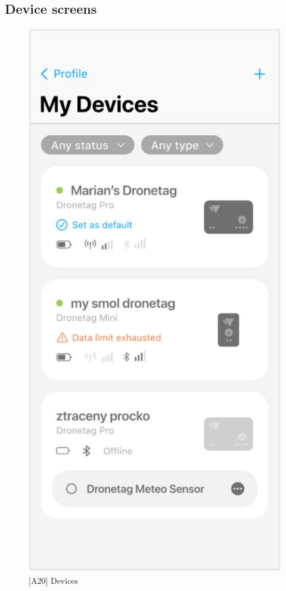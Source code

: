 \subsection{Device screens}\label{subsec:device-screens}


\begin{figure}
    \centering
    \begin{minipage}{.45\textwidth}
        \centering
        \includegraphics[width=.7\linewidth]{assets/user_interface_design/device/devices.png}
        \caption{[A20] Devices}
        \label{fig:devices}
    \end{minipage}%
    \hspace{.05\linewidth}
    \begin{minipage}{.45\textwidth}
        \centering

\end{minipage}
\end{figure}
